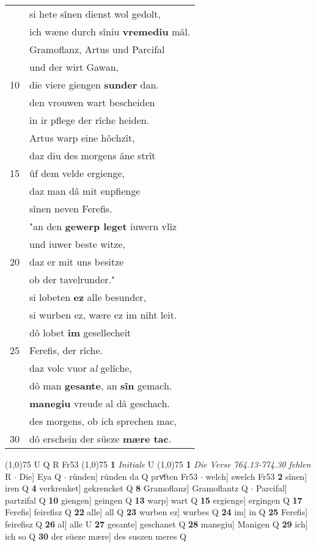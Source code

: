 \documentclass[8pt,a4paper,notitlepage]{article}
\begin{document}
\begin{table}[ht]
\begin{minipage}[t]{0.5\linewidth}
\begin{tabular}{rl}
 & si hete sînen dienst wol gedolt,\\ 
 & ich wæne durch sîniu \textbf{vremediu} mâl.\\ 
 & Gramoflanz, Artus und Parcifal\\ 
 & und der wirt Gawan,\\ 
10 & die viere giengen \textbf{sunder} dan.\\ 
 & den vrouwen wart bescheiden\\ 
 & in ir pflege der rîche heiden.\\ 
 & Artus warp eine hôchzît,\\ 
 & daz diu des morgens âne strît\\ 
15 & ûf dem velde ergienge,\\ 
 & daz man dâ mit enpfienge\\ 
 & sînen neven Ferefis.\\ 
 & "an den \textbf{gewerp leget} iuwern vlîz\\ 
 & und iuwer beste witze,\\ 
20 & daz er mit uns besitze\\ 
 & ob der tavelrunder."\\ 
 & si lobeten \textbf{ez} alle besunder,\\ 
 & si wurben ez, wære ez im niht leit.\\ 
 & dô lobet \textbf{im} gesellecheit\\ 
25 & Ferefis, der rîche.\\ 
 & daz volc vuor a\textit{l} gelîche,\\ 
 & dô man \textbf{gesante}, an \textbf{sîn} gemach.\\ 
 & \textbf{manegiu} vreude al dâ geschach.\\ 
 & des morgens, ob ich sprechen mac,\\ 
30 & dô erschein der süeze \textbf{mære tac}.\\ 
\end{tabular}
\scriptsize
\line(1,0){75} \newline
U Q R Fr53 \newline
\line(1,0){75} \newline
\textbf{1} \textit{Initiale} U  \newline
\line(1,0){75} \newline
\textbf{1} \textit{Die Verse 764.13-774.30 fehlen} R   $\cdot$ Die] Eya Q  $\cdot$ rûnden] rúnden da Q prvͤften Fr53  $\cdot$ welch] swelch Fr53 \textbf{2} sînen] iren Q \textbf{4} verkrenket] gekrencket Q \textbf{8} Gramoflanz] Gramoflantz Q  $\cdot$ Parcifal] partzifal Q \textbf{10} giengen] geingen Q \textbf{13} warp] wart Q \textbf{15} ergienge] ergingen Q \textbf{17} Ferefis] feirefisz Q \textbf{22} alle] all Q \textbf{23} wurben ez] wurbes Q \textbf{24} im] in Q \textbf{25} Ferefis] feirefisz Q \textbf{26} al] alle U \textbf{27} gesante] geschanet Q \textbf{28} manegiu] Manigen Q \textbf{29} ich] ich so Q \textbf{30} der süeze mære] des suszen meres Q \newline
\end{minipage}
\end{table}
\end{document}
